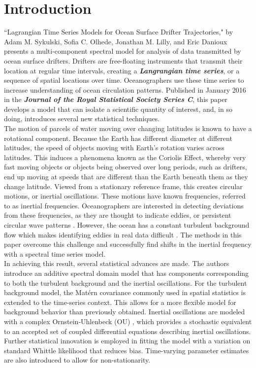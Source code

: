 \documentclass{stat572Style}
\begin{document}
\section{Introduction}
\indent ``Lagrangian Time Series Models for Ocean Surface Drifter Trajectories," by Adam M. Sykulski, Sofia C. Olhede, Jonathan M. Lilly, and Eric Danioux presents a multi-component spectral model for analysis of data transmitted by ocean surface drifters. Drifters are free-floating  instruments that transmit their location at regular time intervals,  creating a \textbf{\it{Langrangian time series}}, or a sequence of spatial locations over time. Oceanographers use these time series to increase understanding of  ocean circulation patterns. Published in January 2016 in the \textbf{\it{Journal of the Royal Statistical Society Series C}}, this paper develops a model that can isolate a scientific quantity of interest,  and, in so doing, introduces several new statistical techniques.\\
\indent The motion of parcels of water moving over changing latitudes is known to have a rotational component. Because the Earth has  different diameter at different latitudes, the speed of objects moving with Earth's rotation varies across latitudes.  This induces a phenomena known as the Coriolis Effect, whereby very fast moving objects or objects being observed over long periods, such as drifters, end up moving at speeds that are different than the Earth beneath them as they change latitude. Viewed from a stationary reference frame, this creates circular motions, or inertial oscillations. These motions have known frequencies, referred to as inertial frequencies. Oceanographers  are interested in detecting deviations from these frequencies, as they are thought to indicate eddies, or persistent circular wave patterns \citep{Kunze1985}. However, the ocean has a constant turbulent background flow which makes identifying eddies in real data difficult \citep{ Elipot2010}. The methods in this paper overcome this challenge and successfully find shifts in the inertial frequency with a spectral time series model. \\
\indent In achieving this result, several statistical advances are made.  The authors introduce an additive spectral domain model that has components corresponding to both the turbulent background and the inertial oscillations. For the turbulent background model, the Mat\'{e}rn covariance commonly used in spatial statistics \citep{Gneiting2012} is extended to the time-series context. This allows for a more flexible model for background behavior than previously obtained.  Inertial oscillations are modeled with a complex Ornstein-Uhlenbeck (OU) \citep{Arato1962, Jeffreys1968}, which provides a stochastic equivalent to an accepted set of coupled differential equations describing inertial oscillations. Further statistical innovation is employed in fitting the model with a variation on standard Whittle likelihood that reduces bias. Time-varying parameter estimates are also introduced to allow for non-stationarity.  \\
\end{document}
